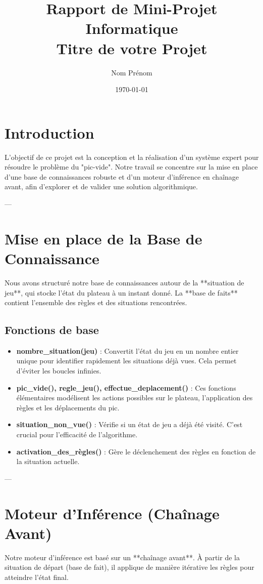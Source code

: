 \documentclass[12pt, a4paper]{article}
\title{Rapport de Mini-Projet Informatique\\
\large{Titre de votre Projet}}
\author{Nom Prénom}
\date{\today}
\begin{document}
\maketitle
\thispagestyle{empty}

\newpage
\tableofcontents
\thispagestyle{fancy}

\section{Introduction}
L'objectif de ce projet est la conception et la réalisation d'un système expert pour résoudre le problème du "pic-vide". Notre travail se concentre sur la mise en place d'une base de connaissances robuste et d'un moteur d'inférence en chaînage avant, afin d'explorer et de valider une solution algorithmique.

---
\section{Mise en place de la Base de Connaissance}
Nous avons structuré notre base de connaissances autour de la **situation de jeu**, qui stocke l'état du plateau à un instant donné. La **base de faits** contient l'ensemble des règles et des situations rencontrées.

\subsection{Fonctions de base}
\begin{itemize}
    \item \textbf{nombre\_situation(jeu)} : Convertit l'état du jeu en un nombre entier unique pour identifier rapidement les situations déjà vues. Cela permet d'éviter les boucles infinies.
    \item \textbf{pic\_vide(), regle\_jeu(), effectue\_deplacement()} : Ces fonctions élémentaires modélisent les actions possibles sur le plateau, l'application des règles et les déplacements du pic.
    \item \textbf{situation\_non\_vue()} : Vérifie si un état de jeu a déjà été visité. C'est crucial pour l'efficacité de l'algorithme.
    \item \textbf{activation\_des\_règles()} : Gère le déclenchement des règles en fonction de la situation actuelle.
\end{itemize}

---
\section{Moteur d'Inférence (Chaînage Avant)}
Notre moteur d'inférence est basé sur un **chaînage avant**. À partir de la situation de départ (base de fait), il applique de manière itérative les règles pour atteindre l'état final.
\end{document}
